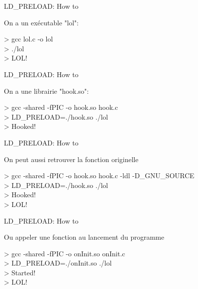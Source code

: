\begin{frame}{LD\_PRELOAD: How to}

	\begin{block}{On a un exécutable "lol":}
		
	\end{block}
    
    > gcc lol.c -o lol \\ > ./lol \\ > LOL!
\end{frame}

\begin{frame}{LD\_PRELOAD: How to}

	\begin{block}{On a une librairie "hook.so":}
		
	\end{block}
    
    > gcc -shared -fPIC -o hook.so hook.c \\
    > LD\_PRELOAD=./hook.so ./lol \\
    > Hooked!
\end{frame}

\begin{frame}{LD\_PRELOAD: How to}

	\begin{block}{On peut aussi retrouver la fonction originelle}
		
	\end{block}
    
    > gcc -shared -fPIC -o hook.so hook.c -ldl -D\_GNU\_SOURCE \\
    > LD\_PRELOAD=./hook.so ./lol \\
    > Hooked!\\
    > LOL!
\end{frame}


\begin{frame}{LD\_PRELOAD: How to}

	\begin{block}{Ou appeler une fonction au lancement du programme}
		
	\end{block}
    
    > gcc -shared -fPIC -o onInit.so onInit.c \\
    > LD\_PRELOAD=./onInit.so ./lol \\
    > Started!\\
    > LOL!
\end{frame}